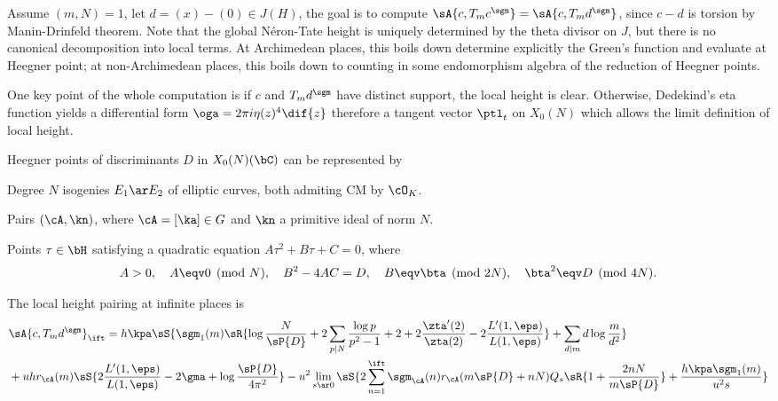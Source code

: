 \documentclass[article, a4paper, twoside]{universal}
\begin{document}

\begin{stp}
	Assume $(m,N)=1$, let $d=(x)-(0)\in J(H)$, the goal is to compute $\sA{c,T_{m}c^{\sgm}}=\sA{c,T_{m}d^{\sgm}}$, since $c-d$ is torsion by Manin-Drinfeld theorem. Note that the global N{\'e}ron-Tate height is uniquely determined by the theta divisor on $J$, but there is no canonical decomposition into local terms. At Archimedean places, this boils down determine explicitly the Green's function and evaluate at Heegner point; at non-Archimedean places, this boils down to counting in some endomorphism algebra of the reduction of Heegner points.

	One key point of the whole computation is if $c$ and $T_{m}d^{\sgm}$ have distinct support, the local height is clear. Otherwise, Dedekind's eta function yields a differential form $\oga=2\pi i\eta(z)^{4}\dif{z}$ therefore a tangent vector $\ptl_{t}$ on $X_{0}(N)$ which allows the limit definition of local height.
\end{stp}


\begin{rcl}
	Heegner points of discriminants $D$ in $X_{0}(N)(\bC)$ can be represented by
	\begin{enr}
		\item Degree $N$ isogenies $E_{1}\ar E_{2}$ of elliptic curves, both admiting CM by $\cO_{K}$.
		\item Pairs $(\cA,\kn)$, where $\cA=[\ka]\in G$ and $\kn$ a primitive ideal of norm $N$.
		\item Points $\tau\in\bH$ satisfying a quadratic equation $A\tau^{2}+B\tau+C=0$, where
		\[
			A>0,\quad A\eqv0\pmod{N},\quad B^{2}-4AC=D,\quad B\eqv\bta\pmod{2N},\quad \bta^{2}\eqv D\pmod{4N}.
		\]
	\end{enr}
\end{rcl}

\begin{thm}[{\cite[II.4.2]{GZ1986}}]\label{thm:htinf}
	The local height pairing at infinite places is
	\begin{align*}
			 &\sA{c,T_{m}d^{\sgm}}_{\ift}=h\kpa\sS{\sgm_{1}(m)\sR{\log\frac{N}{\sP{D}}+2\sum_{p\mid N}\frac{\log p}{p^{2}-1}+2+2\frac{\zta'(2)}{\zta(2)}-2\frac{L'(1,\eps)}{L(1,\eps)}}+\sum_{d\mid m}d\log\frac{m}{d^{2}}}\\
		  &+uhr_{\cA}(m)\sS{2\frac{L'(1,\eps)}{L(1,\eps)}-2\gma+\log\frac{\sP{D}}{4\pi^{2}}}-u^{2}\lim_{s\ar0}\sS{2\sum_{n=1}^{\ift}\sgm_{\cA}(n)r_{\cA}(m\sP{D}+nN)Q_{s}\sR{1+\frac{2nN}{m\sP{D}}}+\frac{h\kpa\sgm_{1}(m)}{u^{2}s}}
	\end{align*}
\end{thm}
\end{document}
